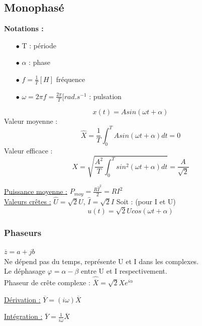 \documentclass[../main.tex]{subfiles}
\begin{document}
\subsection{Monophasé}
\textbf{Notations :}\begin{itemize}
    \item[$\bullet$] T : période\\
    \item[$\bullet$] $\alpha$ : phase\\
    \item[$\bullet$] $f = \frac{1}{T}[H]$ fréquence\\
    \item[$\bullet$] $\omega = 2\pi f = \frac{2\pi}{T}[rad.s^{-1}$ : pulsation
\end{itemize}

\begin{equation}
    x(t) = Asin(\omega t+\alpha)
\end{equation}
Valeur moyenne : 
\begin{equation}
    \hat{X} = \frac{1}{T}\int_0^TAsin(\omega t+\alpha)dt = 0
\end{equation}
Valeur efficace :
\begin{equation}
    X=\sqrt{\frac{A^2}{T}\int_0^Tsin^2(\omega t+\alpha)dt} = \frac{A}{\sqrt{2}}
\end{equation}

\quad \underline{Puissance moyenne :}
$P_{moy} = \frac{R \hat{I}^2}{2} = R I^2$\\

\quad \underline{Valeurs crêtes :}
$\hat{U} = \sqrt{2}U$, $\hat{I} = \sqrt{2}I$
Soit : (pour I et U)
\begin{equation}
    u(t) = \sqrt{2}U cos(\omega t+\alpha)
\end{equation}

\subsubsection{Phaseurs}
$\overline{z} = a+jb$\\
Ne dépend pas du temps, représente U et I dans les complexes.\\
Le déphasage $\varphi = \alpha-\beta$ entre U et I respectivement. \\
Phaseur de crête complexe : $\hat{\overline{X}} = \sqrt{2}Xe^{i\alpha}$

\quad \underline{Dérivation :}
$\overline{Y} = (i \omega) \overline{X}$

\quad \underline{Intégration :}
$\overline{Y} = \frac{1}{i \omega} \overline{X}$\\
\end{document}
